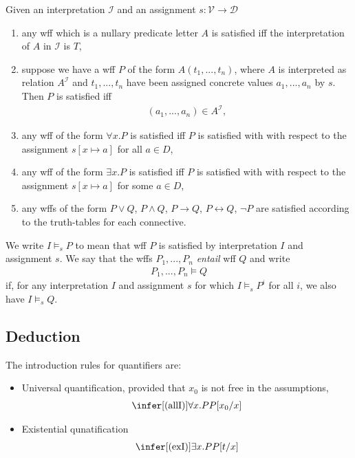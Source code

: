 \documentclass{article}
\begin{document}
\begin{definition}[Satisfaction]
	Given an interpretation $\mathcal{I}$ and an assignment $s:\mathcal{V}\to\mathcal{D}$
	\begin{enumerate}
		\item any wff which is a nullary predicate letter $A$ is satisfied iff the
		      interpretation of $A$ in $\mathcal{I}$ is $T$,
		\item suppose we have a wff $P$ of the form $A(t_1,..., t_n)$, where $A$ is
		      interpreted as relation $A^\mathcal{I}$ and $t_1,...,t_n$ have been assigned
		      concrete values $a_1,...,a_n$ by $s$. Then $P$ is satisfied iff \begin{align*}
			      (a_1,...,a_n)\in A^\mathcal{I},
		      \end{align*}
		\item any wff of the form $\forall x.P$ is satisfied iff $P$ is satisfied with
		      with respect to the assignment $s[x\mapsto a]$ for all $a\in D$,
		\item any wff of the form $\exists x.P$ is satisfied iff $P$ is satisfied with
		      with respect to the assignment $s[x\mapsto a]$ for some $a\in D$,
		\item any wffs of the form $P\vee Q$, $P\wedge Q$, $P\rightarrow Q$, $P\leftrightarrow Q$,
		      $\neg P$ are satisfied according to the truth-tables for each connective.
	\end{enumerate}
\end{definition}

\begin{definition}[Entailment]
	We write $I\vDash_s P$ to mean that wff $P$ is satisfied by interpretation $I$ and
	assignment $s$.  We say that the wffs $P_1,...,P_n$ \emph{entail} wff $Q$ and write
	\begin{align*}
		P_1,...,P_n\vDash Q
	\end{align*}
	if, for any interpretation $I$ and assignment $s$ for which $I\vDash_s P^i$ for all $i$,
	we also have $I\vDash_s Q$.
\end{definition}

\subsection{Deduction}

\begin{definition}
	The introduction rules for quantifiers are:
	\begin{itemize}
		\item Universal quantification, provided that $x_0$ is not free in the assumptions, \begin{align*}
			      \infer[(\text{allI})]{\forall x. P}{P[x_0/x]}
		      \end{align*}
		\item Existential qunatification \begin{align*}
			      \infer[(\text{exI})]{\exists x.P}{P[t/x]}
		      \end{align*}
	\end{itemize}
\end{definition}
\end{document}
